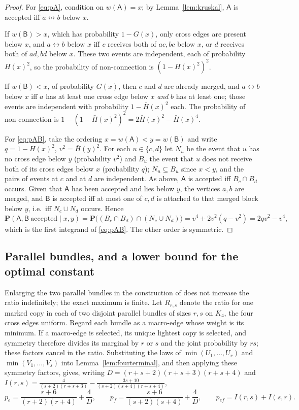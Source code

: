 \documentclass[10pt,a4paper]{amsart}
\newcommand{\PP}{\mathbf{P}}
\begin{document}
\begin{proof}
For \eqref{eq:pA}, condition on $w(\mathsf A)=x$; by Lemma~\ref{lem:kruskal},
$\mathsf A$ is accepted iff $a\not\leftrightarrow b$ below $x$.

If $w(\mathsf B)>x$, which has probability $1-G(x)$, only cross edges are
present below $x$, and $a\leftrightarrow b$ below $x$ iff $c$ receives both of
$ac,bc$ below $x$, or $d$ receives both of $ad,bd$ below $x$. These two events
are independent, each of probability $H(x)^2$, so the probability of
non-connection is $(1-H(x)^2)^2$.

If $w(\mathsf B)<x$, of probability $G(x)$, then $c$ and $d$ are already merged,
and $a\leftrightarrow b$ below $x$ iff $a$ has at least one cross edge below $x$
\emph{and} $b$ has at least one; those events are independent with probability
$1-\bar H(x)^2$ each. The probability of non-connection is
$1-(1-\bar H(x)^2)^2=2\bar H(x)^2-\bar H(x)^4$.

For \eqref{eq:pAB}, take the ordering $x=w(\mathsf A)<y=w(\mathsf B)$ and write
$q=1-H(x)^2$, $v^2=\bar H(y)^2$. For each $u\in\{c,d\}$ let $N_u$ be the event
that $u$ has no cross edge below $y$ (probability $v^2$) and $B_u$ the event
that $u$ does not receive both of its cross edges below $x$ (probability $q$);
$N_u\subseteq B_u$ since $x<y$, and the pairs of events at $c$ and at $d$ are
independent. As above, $\mathsf A$ is accepted iff $B_c\cap B_d$ occurs. Given
that $\mathsf A$ has been accepted and lies below $y$, the vertices $a,b$ are
merged, and $\mathsf B$ is accepted iff at most one of $c,d$ is attached to that
merged block below $y$, i.e.\ iff $N_c\cup N_d$ occurs. Hence
\[
\PP(\mathsf A,\mathsf B\ \text{accepted}\mid x,y)
=\PP\bigl((B_c\cap B_d)\cap(N_c\cup N_d)\bigr)
=v^4+2v^2(q-v^2)=2qv^2-v^4 ,
\]
which is the first integrand of \eqref{eq:pAB}. The other order is symmetric.
\end{proof}

\subsection{Parallel bundles, and a lower bound for the optimal constant}

Enlarging the two parallel bundles in the construction of \cite{LPS} does not
increase the ratio indefinitely; the exact maximum is finite. Let $R_{r,s}$
denote the ratio for one marked copy in
each of two disjoint parallel bundles of sizes $r,s$ on $K_4$, the four cross
edges uniform. Regard each bundle as a macro-edge whose weight is its minimum.
If a macro-edge is selected, its unique lightest copy is selected, and symmetry
therefore divides its marginal by $r$ or $s$ and the joint probability by
$rs$; these factors cancel in the ratio. Substituting the laws of
$\min(U_1,\dots,U_r)$ and $\min(V_1,\dots,V_s)$ into
Lemma~\ref{lem:fourterminal}, and then applying these symmetry factors, gives,
writing $D=(r+s+2)(r+s+3)(r+s+4)$ and
$I(r,s)=\frac4{(s+2)(r+s+3)}-\frac{3s+10}{(s+2)(s+4)(r+s+4)}$,
\[
p_e=\frac{r+6}{(r+2)(r+4)}+\frac4D,\qquad
p_f=\frac{s+6}{(s+2)(s+4)}+\frac4D,\qquad
p_{ef}=I(r,s)+I(s,r).
\]
\end{document}
